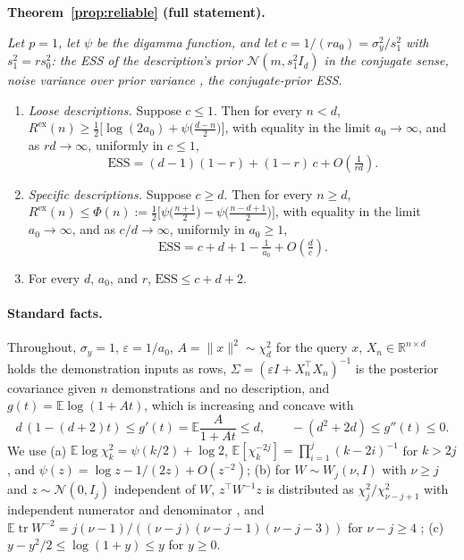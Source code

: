 \documentclass[10pt]{article}
\newcommand{\ess}{\mathrm{ESS}}
\newcommand{\E}{\mathbb{E}}
\newcommand{\R}{\mathbb{R}}
\begin{document}
\medskip\noindent\textbf{Theorem~\ref{prop:reliable} (full statement).} {\itshape Let $p = 1$, let $\psi$ be the digamma function, and let $c = 1/(r a_0) = \sigma_y^2 / s_1^2$ with $s_1^2 = r s_0^2$: the ESS of the description's prior $\mathcal{N}(m, s_1^2 I_d)$ in the conjugate sense, noise variance over prior variance \citep{neuenschwander2020}, the conjugate-prior ESS.
\begin{enumerate}
\item[(i)] \emph{Loose descriptions.} Suppose $c \le 1$. Then for every $n < d$,
$R^{\mathrm{ex}}(n) \ge \tfrac12\big[\log(2a_0) + \psi\big(\tfrac{d-n}{2}\big)\big]$, with equality in the limit $a_0 \to \infty$, and as $rd \to \infty$, uniformly in $c \le 1$,
\[
\ess = (d-1)(1-r) + (1-r)\,c + O\!\left(\tfrac{1}{rd}\right).
\]
\item[(ii)] \emph{Specific descriptions.} Suppose $c \ge d$. Then for every $n \ge d$,
$R^{\mathrm{ex}}(n) \le \Phi(n) := \tfrac12\big[\psi\big(\tfrac{n+1}{2}\big) - \psi\big(\tfrac{n-d+1}{2}\big)\big]$, with equality in the limit $a_0 \to \infty$, and as $c/d \to \infty$, uniformly in $a_0 \ge 1$,
\[
\ess = c + d + 1 - \tfrac{1}{a_0} + O\!\left(\tfrac{d}{c}\right).
\]
\item[(iii)] For every $d$, $a_0$, and $r$, $\ess \le c + d + 2$.
\end{enumerate}}
\medskip

\paragraph{Standard facts.}
Throughout, $\sigma_y = 1$, $\varepsilon = 1/a_0$, $A = \|x\|^2 \sim \chi^2_d$ for the query $x$, $X_n \in \R^{n \times d}$ holds the demonstration inputs as rows, $\Sigma = (\varepsilon I + X_n^\top X_n)^{-1}$ is the posterior covariance given $n$ demonstrations and no description, and $g(t) = \E \log(1 + At)$, which is increasing and concave with
\begin{equation}\label{eq:g-derivs}
d\,(1 - (d+2)t) \le g'(t) = \E \frac{A}{1 + At} \le d,
\qquad
-(d^2 + 2d) \le g''(t) \le 0 .
\end{equation}
We use (a) $\E \log \chi^2_k = \psi(k/2) + \log 2$, $\E[\chi_k^{-2j}] = \prod_{i=1}^{j} (k - 2i)^{-1}$ for $k > 2j$, and $\psi(z) = \log z - 1/(2z) + O(z^{-2})$; (b) for $W \sim W_j(\nu, I)$ with $\nu \ge j$ and $z \sim \mathcal{N}(0, I_j)$ independent of $W$, $z^\top W^{-1} z$ is distributed as $\chi^2_j / \chi^2_{\nu-j+1}$ with independent numerator and denominator \citep[Theorem~3.2.12]{muirhead1982}, and $\E \operatorname{tr} W^{-2} = j(\nu-1)/((\nu-j)(\nu-j-1)(\nu-j-3))$ for $\nu - j \ge 4$ \citep{vonrosen1988}; (c) $y - y^2/2 \le \log(1 + y) \le y$ for $y \ge 0$.
\end{document}
